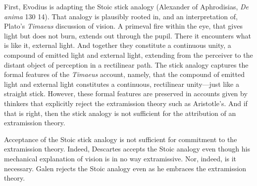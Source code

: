 \documentclass[12pt]{article}
\begin{document}
First, Evodius is adapting the Stoic stick analogy (Alexander of Aphrodisias, \emph{De anima} 130 14). That analogy is plausibly rooted in, and an interpretation of, Plato's \emph{Timaeus} discussion of vision. A primeval fire within the eye, that gives light but does not burn, extends out through the pupil. There it encounters what is like it, external light. And together they constitute a continuous unity, a compound of emitted light and external light, extending from the perceiver to the distant object of perception in a rectilinear path. The stick analogy captures the formal features of the \emph{Timaeus} account, namely, that the compound of emitted light and external light constitutes a continuous, rectilinear unity---just like a straight stick. However, these formal features are preserved in accounts given by thinkers that explicitly reject the extramission theory such as Aristotle's. And if that is right, then the stick analogy is not sufficient for the attribution of an extramission theory. 


Acceptance of the Stoic stick analogy is not sufficient for commitment to the extramission theory. Indeed, Descartes accepts the Stoic analogy even though his mechanical explanation of vision is in no way extramissive. Nor, indeed, is it necessary.  Galen rejects the Stoic analogy even as he embraces the extramission theory.
\end{document}
